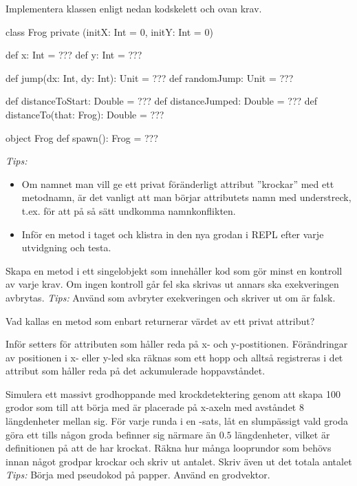 \Subtask Implementera klassen  enligt nedan kodskelett och ovan krav.

\begin{Code}
class Frog private (initX: Int = 0, initY: Int = 0) {
  def x: Int = ???
  def y: Int = ???

  def jump(dx: Int, dy: Int): Unit = ???
  def randomJump: Unit = ???

  def distanceToStart: Double = ???
  def distanceJumped: Double = ???
  def distanceTo(that: Frog): Double = ???
}
object Frog {
  def spawn(): Frog = ???
}
\end{Code}
\emph{Tips:}
\begin{itemize} [nolistsep, noitemsep]
\item Om namnet man vill ge ett privat föränderligt attribut ''krockar'' med ett metodnamn, är det vanligt att man börjar attributets namn med understreck, t.ex.  för att på så sätt undkomma namnkonflikten.
\item Inför en metod i taget och klistra in den nya grodan i REPL efter varje utvidgning och testa.
\end{itemize}



\Subtask Skapa en metod  i ett singelobjekt  som innehåller kod som gör minst en kontroll av varje krav. Om ingen kontroll går fel ska  skrivas ut annars ska exekveringen avbrytas. \emph{Tips:} Använd  som avbryter exekveringen och skriver ut  om  är falsk.

\Subtask Vad kallas en metod som enbart returnerar värdet av ett privat attribut?

\Subtask Inför setters för attributen som håller reda på x- och y-postitionen. Förändringar av positionen i x- eller y-led ska räknas som ett hopp och alltså registreras i det attribut som håller reda på det ackumulerade hoppavståndet.

\Subtask Simulera ett massivt grodhoppande med krockdetektering genom att skapa 100 grodor som till att börja med är placerade på x-axeln med avståndet $8$ längdenheter mellan sig. För varje runda i en -sats, låt en slumpässigt vald groda göra ett  tills någon groda befinner sig närmare än $0.5$ längdenheter, vilket är definitionen på att de har krockat. Räkna hur många looprundor som behövs innan något grodpar krockar och skriv ut antalet. Skriv även ut det totala antalet \\ \emph{Tips:} Börja med pseudokod på papper. Använd en grodvektor.


